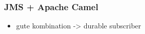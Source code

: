 \subsubsection{JMS + Apache Camel} %
\label{ssub:analyse_jms_apache_camel}

\begin{itemize}
    \item gute kombination -> durable subscriber
\end{itemize}






